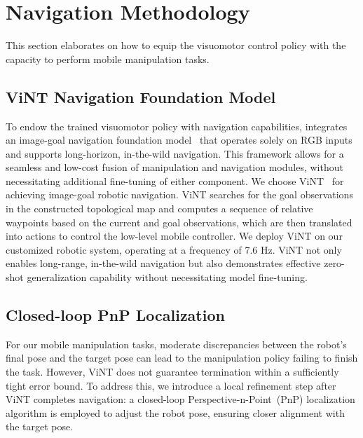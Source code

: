 \section{Navigation Methodology}
This section elaborates on how to equip the visuomotor control policy with the capacity to perform mobile manipulation tasks.

\subsection{ViNT Navigation Foundation Model}
To endow the trained visuomotor policy with navigation capabilities, \ourshort integrates an image-goal navigation foundation model~\cite{shah2023gnm,shah2023vint,sridhar2024nomad} that operates solely on RGB inputs and supports long-horizon, in-the-wild navigation. This framework allows for a seamless and low-cost fusion of manipulation and navigation modules, without necessitating additional fine-tuning of either component. We choose ViNT~\cite{shah2023vint} for achieving image-goal robotic navigation.  ViNT searches for the goal observations in the constructed topological map and computes a sequence of relative waypoints based on the current and goal observations, which are then translated into actions to control the low-level mobile controller. We deploy ViNT on our customized robotic system, operating at a frequency of 7.6 Hz. ViNT not only enables long-range, in-the-wild navigation but also demonstrates effective zero-shot generalization capability without necessitating model fine-tuning. 


\subsection{Closed-loop PnP Localization}
For our mobile manipulation tasks, moderate discrepancies between the robot's final pose and the target pose can lead to the manipulation policy failing to finish the task. However, ViNT does not guarantee termination within a sufficiently tight error bound. To address this, we introduce a local refinement step after ViNT completes navigation: a closed-loop Perspective-n-Point~(PnP) localization algorithm is employed to adjust the robot pose, ensuring closer alignment with the target pose.

